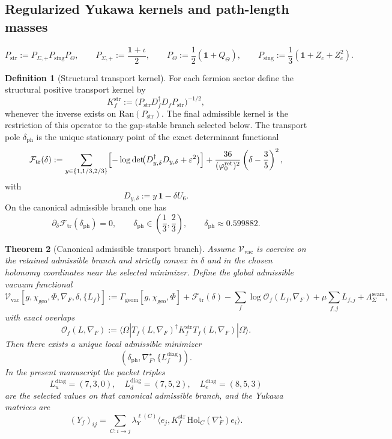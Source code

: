 \documentclass[11pt,a4paper]{article}
\newtheorem{theorem}{Theorem}[section]
\theoremstyle{definition}
\newtheorem{definition}[theorem]{Definition}
\theoremstyle{remark}
\newcommand{\Seam}{\Sigma}
\newcommand{\inv}{\iota}
\newcommand{\phiz}{\varphi_0^{\mathrm{ret}}}
\newcommand{\chigeo}{\chi_{\mathrm{geo}}}
\begin{document}
\subsection{Regularized Yukawa kernels and path-length masses}

\[
P_{\mathrm{str}}:=P_{\Seam,+}P_{\mathrm{sing}}P_\Theta,
\qquad
P_{\Seam,+}:=\frac{\mathbf 1+\inv}{2},
\qquad
P_\Theta:=\frac12(\mathbf 1+Q_\Theta),
\qquad
P_{\mathrm{sing}}:=\frac13(\mathbf 1+Z_c+Z_c^2).
\]

\begin{definition}[Structural transport kernel]
For each fermion sector define the structural positive transport kernel by
\[
K_f^{\mathrm{str}}:=\bigl(P_{\mathrm{str}} D_f^\dagger D_f P_{\mathrm{str}}\bigr)^{-1/2},
\]
whenever the inverse exists on $\mathrm{Ran}(P_{\mathrm{str}})$. The final admissible kernel is
the restriction of this operator to the gap-stable branch selected below. The transport pole
$\delta_{\mathrm{ph}}$ is the unique stationary point of the exact determinant functional
\[
\mathcal F_{\mathrm{tr}}(\delta)
:=
\sum_{y\in\{1,1/3,2/3\}}
\Bigl[-\log\det\!\bigl(D_{y,\delta}^\dagger D_{y,\delta}+\varepsilon^2\bigr)\Bigr]
+
\frac{36}{(\phiz)^2}\left(\delta-\frac35\right)^2,
\]
with
\[
D_{y,\delta}:=y\,\mathbf 1-\delta U_6.
\]
On the canonical admissible branch one has
\begin{equation}
\label{eq:transport-bridge-offset}
\partial_\delta \mathcal F_{\mathrm{tr}}(\delta_{\mathrm{ph}})=0,
\qquad
\delta_{\mathrm{ph}}\in\left(\frac13,\frac23\right),
\qquad
\delta_{\mathrm{ph}}\approx \num{0.599882}.
\end{equation}
\end{definition}

\begin{theorem}[Canonical admissible transport branch]
\label{thm:exact-transport-closure}
Assume $\mathcal V_{\mathrm{vac}}$ is coercive on the retained admissible branch and strictly
convex in $\delta$ and in the chosen holonomy coordinates near the selected minimizer.
Define the global admissible vacuum functional
\[
\mathcal V_{\mathrm{vac}}[g,\chigeo,\Phi,\nabla_F,\delta,\{L_f\}]
:=
\Gamma_{\mathrm{geom}}[g,\chigeo,\Phi]
+\mathcal F_{\mathrm{tr}}(\delta)
-\sum_f \log \mathcal O_f(L_f,\nabla_F)
+\mu\sum_{f,j}L_{f,j}
+\Lambda_\Seam^{\mathrm{seam}},
\]
with exact overlaps
\[
\mathcal O_f(L,\nabla_F):=
\langle\Omega|
T_f(L,\nabla_F)^\dagger
K_f^{\mathrm{str}}
T_f(L,\nabla_F)
|\Omega\rangle.
\]
Then there exists a unique local admissible minimizer
\[
(\delta_{\mathrm{ph}},\nabla_F^\star,\{L_f^{\mathrm{diag}}\}).
\]
In the present manuscript the packet triples
\[
L_u^{\mathrm{diag}}=(7,3,0),\quad
L_d^{\mathrm{diag}}=(7,5,2),\quad
L_e^{\mathrm{diag}}=(8,5,3)
\]
are the selected values on that canonical admissible branch, and the Yukawa matrices are
\[
(Y_f)_{ij}
=
\sum_{C:i\to j}\lambda_Y^{\ell(C)}
\langle e_j,K_f^{\mathrm{str}}\,\mathrm{Hol}_{C}(\nabla_F^\star)e_i\rangle.
\]
\end{theorem}
\end{document}
